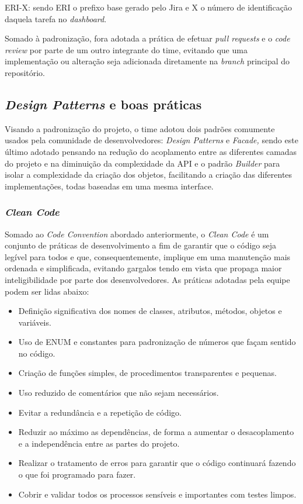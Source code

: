 \documentclass[
    12pt,               %
    openright,          %
    oneside,
    a4paper,            %
    BIBLATEX,           %
    TODO,               %
    english,            %
    brazil              %
    ]{ifsp-spo-inf-ctds}
\begin{document}
    ERI-X: sendo ERI o prefixo base gerado pelo Jira e X o número de identificação daquela tarefa no \emph{dashboard}.

    Somado à padronização, fora adotada a prática de efetuar \emph{ pull requests} e o \emph{code review} por parte de um outro integrante do time, evitando que uma implementação ou alteração seja adicionada diretamente na \emph{branch} principal do repositório.

    \subsection{\emph{Design Patterns} e boas práticas}
    Visando a padronização do projeto, o time adotou dois padrões comumente usados pela comunidade de desenvolvedores: \emph{Design Patterns} e \emph{Facade,} sendo este último adotado pensando na redução do acoplamento entre as diferentes camadas do projeto e na diminuição da complexidade da API e o padrão \emph{Builder} para isolar a complexidade da criação dos objetos, facilitando a criação das diferentes implementações, todas baseadas em uma mesma interface.

    \subsubsection{\emph{Clean Code}}
    Somado ao \emph{Code Convention} abordado anteriormente, o \emph{Clean Code} é um conjunto de práticas de desenvolvimento a fim de garantir que o código seja legível para todos e que, consequentemente, implique em uma manutenção mais ordenada e simplificada, evitando gargalos tendo em vista que propaga maior inteligibilidade por parte dos desenvolvedores. As práticas adotadas pela equipe podem ser lidas abaixo:

    \begin{itemize}
        \item 
        Definição significativa dos nomes de classes, atributos, métodos, objetos e variáveis.
        \item
        Uso de ENUM e constantes para padronização de números que façam sentido no código.
        \item
        Criação de funções simples, de procedimentos transparentes e pequenas.
        \item
        Uso reduzido de comentários que não sejam necessários.
        \item
        Evitar a redundância e a repetição de código.
        \item
        Reduzir ao máximo as dependências, de forma a aumentar o desacoplamento e a independência entre as partes do projeto.
        \item
        Realizar o tratamento de erros para garantir que o código continuará fazendo o que foi programado para fazer.
        \item
        Cobrir e validar todos os processos sensíveis e importantes com testes limpos.
    \end{itemize}
\end{document}
